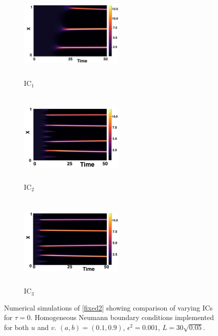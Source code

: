 \begin{figure}[H]
    \centering
    \begin{subfigure}[b]{0.32\textwidth}
        \centering
        \includegraphics[width=5cm,height=4.5cm]{gaff0.png}
        \caption{$\text{IC}_1$}
        \label{}
    \end{subfigure}
    \hfill
    \begin{subfigure}[b]{0.32\textwidth}
        \centering
        \includegraphics[width=5cm,height=4.5cm]{ic20.png}
        \caption{$\text{IC}_2$}
        \label{}
    \end{subfigure}
    \hfill
    \begin{subfigure}[b]{0.32\textwidth}
        \centering
        \includegraphics[width=5cm,height=4.5cm]{ic30.png}
        \caption{$\text{IC}_3$}
        \label{}
    \end{subfigure}
    \caption{Numerical simulations of \eqref{fixed2} showing comparison of varying ICs for $\tau=0$. Homogeneous Neumann boundary conditions implemented for both $u$ and $v$. $(a,b)=(0.1,0.9)$, $\epsilon^2=0.001$, $L=30\sqrt{0.05}$. }
    \label{fig:figtau0}
\end{figure}
